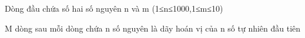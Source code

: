 Dòng đầu chứa số hai số nguyên n và m (1≤n≤1000,1≤m≤10)  

   M dòng sau mỗi dòng chứa n số nguyên là dãy hoán vị của n số tự nhiên đầu tiên  

\
